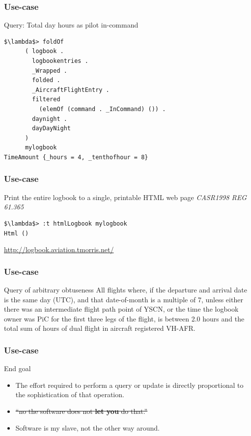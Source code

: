 \begin{frame}[fragile]
\frametitle{Use-case}
\begin{block}{Query: Total day hours as pilot in-command}
\begin{lstlisting}[style=haskell,basicstyle=\scriptsize\ttfamily,mathescape]
$\lambda$> foldOf
      ( logbook .
        logbookentries .
        _Wrapped .
        folded .
        _AircraftFlightEntry .
        filtered
          (elemOf (command . _InCommand) ()) .
        daynight .
        dayDayNight
      )
      mylogbook
TimeAmount {_hours = 4, _tenthofhour = 8}
\end{lstlisting}
\end{block}
\end{frame}

\begin{frame}[fragile]
\frametitle{Use-case}
\begin{block}{Print the entire logbook to a single, printable HTML web page \emph{CASR1998 REG 61.365}}
\begin{lstlisting}[style=haskell,mathescape]
$\lambda$> :t htmlLogbook mylogbook
Html ()
\end{lstlisting}
\end{block}
\href{http://logbook.aviation.tmorris.net/}{http://logbook.aviation.tmorris.net/}
\end{frame}

\begin{frame}[fragile]
\frametitle{Use-case}
\begin{block}{Query of arbitrary obtuseness}
All flights where, if the departure and arrival date is the same day (UTC), and that date-of-month is a multiple of 7, unless either there was an intermediate flight path point of YSCN, or the time the logbook owner was PiC for the first three legs of the flight, is between 2.0 hours and the total sum of hours of dual flight in aircraft registered VH-AFR.
\end{block}
\end{frame}

\begin{frame}[fragile]
\frametitle{Use-case}
\begin{block}{End goal}
\begin{itemize}
\item<1-> The effort required to perform a query or update is directly proportional to the sophistication of that operation.
\item<2->\sout{``no the software does not \textbf{let you} do that.''}
\item<3-> Software is my slave, not the other way around.
\end{itemize}
\end{block}
\end{frame}
